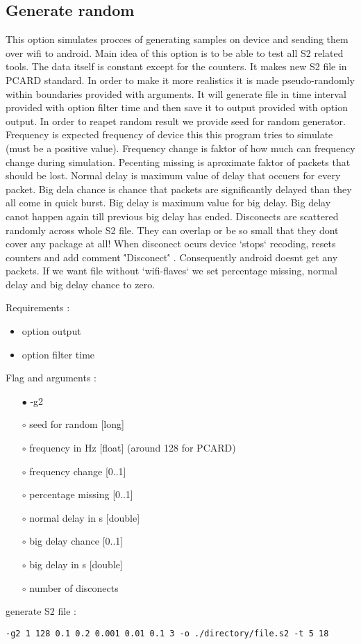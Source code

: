 \documentclass[english]{article}
\begin{document}
\subsection{Generate random}
This option simulates procces of generating samples on device and sending them over wifi to android. Main idea of this option is to be able to test all S2 related tools. The data itself is constant except for the counters. It makes new S2 file in PCARD standard. In order to make it more realistics it is made pseudo-randomly within boundaries provided with arguments. It will generate file in time interval provided with option filter time and then save it to output provided with option output. In order to reapet random result we provide seed for random generator. Frequency is expected frequency of device this this program tries to simulate (must be a positive value). Frequency change is faktor of how much can frequency change during simulation. Pecenting missing is aproximate faktor of packets that should be lost. Normal delay is maximum value of delay that occuers for every packet. Big dela chance is chance that packets are significantly delayed than they all come in quick burst. Big delay is maximum value for big delay. Big delay canot happen again till previous big delay has ended. Disconects are scattered randomly across whole S2 file. They can overlap or be so small that they dont cover any package at all! When disconect ocurs device `stops` recoding, resets counters and add comment \''Disconect\'' . Consequently android doesnt get any packets. If we want file without `wifi-flaves` we set percentage missing, normal delay and big delay chance to zero. 

\noindent Requirements : 
\begin{itemize}
\item option output
\item option filter time
\end{itemize}
Flag and arguments :

\begin{itemize}
\item[$\bullet$] -g2
\item[$\circ$] seed for random [long]
\item[$\circ$] frequency in Hz [float] (around 128 for PCARD)
\item[$\circ$] frequency change [0..1]
\item[$\circ$] percentage missing [0..1]
\item[$\circ$] normal delay in s [double]
\item[$\circ$] big delay chance [0..1]
\item[$\circ$] big delay in s [double]
\item[$\circ$] number of disconects

\end{itemize}
generate S2 file : 
\begin{lstlisting} 
-g2 1 128 0.1 0.2 0.001 0.01 0.1 3 -o ./directory/file.s2 -t 5 18
\end{lstlisting}
\end{document}
